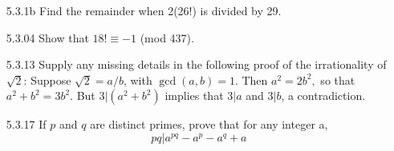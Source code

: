 \documentclass[12pt]{article}
\begin{document}
\begin{enumerate}
	\item[5.3.1b] Find the remainder when 2(26!) is divided by 29.
	
	\item[5.3.04] Show that $ 18! \equiv -1 $ (mod 437).
	
	\item[5.3.13] Supply any missing details in the following proof of the irrationality of $ \sqrt{2} $: Suppose $ \sqrt{2} = a/b $, with $ \gcd(a,b)=1 $. Then $ a^2=2b^2, $ so that $ a^2+b^2=3b^2 $. But $ 3 | (a^2+b^2) $ implies that $ 3|a $ and $ 3|b $, a contradiction.
	
	\item[5.3.17] If $ p $ and $ q $ are distinct primes, prove that for any integer a,
		\[pq|a^{pq}-a^p-a^q+a\]

\end{enumerate}
\end{document}
